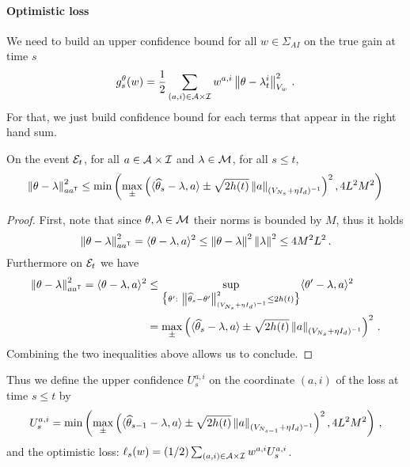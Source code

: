 \paragraph{Optimistic loss} We need to build an upper confidence bound for all $w\in\Sigma_{AI}$ on the true gain at time $s$
\[
g_{s}^{\theta}(w) = \frac{1}{2} \sum_{(a,i)\in\mathcal{A}\times\mathcal{I}} w^{a,i} \left\lVert\theta - \lambda_t^i\right\rVert_{V_{w}}^2\,.
\]
For that, we just build confidence bound for each terms that appear in the right hand sum.
\begin{lemma}
\label{lem:confidence_bound_general}
On the event $\mathcal{E}_t$, for all $a\in\mathcal{A}\times\mathcal{I}$ and $\lambda\in\mathcal{M}$, for all $s\leq t$,
\[
\left\lVert\theta-\lambda\right\rVert^2_{aa^{\mathsf{\scriptscriptstyle T}}} \leq \min\left(\max_\pm \left( \langle \widehat{\theta}_{s} - \lambda,a\rangle \pm \sqrt{2 h(t)} \left\lVert a\right\rVert_{(V_{N_s}+ \eta I_d)^{-1}} \right)^2,4L^2 M^2\right)
\]
\end{lemma}
\begin{proof}
First, note that since $\theta,\lambda\in\mathcal{M}$ their norms is bounded by $M$, thus it holds
\[
\left\lVert\theta-\lambda\right\rVert^2_{aa^{\mathsf{\scriptscriptstyle T}}} = \langle\theta-\lambda,a \rangle^2 \leq \left\lVert\theta-\lambda\right\rVert^2 \left\lVert\lambda\right\rVert^2 \leq 4M^2L^2\,.
\]
Furthermore on $\mathcal{E}_t$ we have
\begin{align*}
\left\lVert\theta-\lambda\right\rVert^2_{aa^{\mathsf{\scriptscriptstyle T}}} = \langle\theta-\lambda,a \rangle^2 &\leq \sup_{\big\{\theta':\ \left\lVert\widehat{\theta}_s-\theta'\right\rVert^2_{(V_{N_s} + \eta I_d)^{-1} } \leq 2h(t)\big\}} \langle\theta'-\lambda,a \rangle^2\\
&=\max_\pm \left( \langle \widehat{\theta}_{s} - \lambda,a\rangle \pm \sqrt{2 h(t)} \left\lVert a\right\rVert_{(V_{N_s}+ \eta I_d)^{-1}} \right)^2\,.
\end{align*}
Combining the two inequalities above allows us to conclude.
\end{proof}
Thus we define the upper confidence $U_s^{a,i}$ on the coordinate $(a,i)$ of the loss at time $s\leq t$ by
\begin{equation}
\label{eq:def_ucb_br_general}
U_s^{a,i} = \min\left(\max_\pm \left( \langle \widehat{\theta}_{s-1} - \lambda,a\rangle \pm \sqrt{2 h(t)} \left\lVert a\right\rVert_{(V_{N_{s-1}}+ \eta I_d)^{-1}} \right)^2,4L^2 M^2\right)\,,
\end{equation}
and the optimistic loss: $\ell_s(w) = (1/2)\sum_{(a,i)\in\mathcal{A}\times\mathcal{I}} w^{a,i} U_s^{a,i}$.



